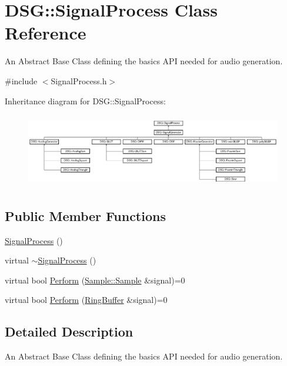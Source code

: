 \hypertarget{classDSG_1_1SignalProcess}{\section{D\+S\+G\+:\+:Signal\+Process Class Reference}
\label{classDSG_1_1SignalProcess}
}


An Abstract Base Class defining the basics A\+P\+I needed for audio generation.  




{\ttfamily \#include $<$Signal\+Process.\+h$>$}

Inheritance diagram for D\+S\+G\+:\+:Signal\+Process\+:\begin{figure}[H]
\begin{center}
\leavevmode
\includegraphics[height=3.245033cm]{classDSG_1_1SignalProcess}
\end{center}
\end{figure}
\subsection*{Public Member Functions}
\begin{DoxyCompactItemize}
\item 
\hyperlink{classDSG_1_1SignalProcess_a3fd4347483bcf3cc0a3d7bf98ff56218}{Signal\+Process} ()
\item 
virtual \hyperlink{classDSG_1_1SignalProcess_ad9b6a758241a092ddc38e13effc9553f}{$\sim$\+Signal\+Process} ()
\item 
virtual bool \hyperlink{classDSG_1_1SignalProcess_afdb8220100418893950c1161dd24db67}{Perform} (\hyperlink{classDSG_1_1Sample_aaf2e30d73911eccea99b53eeee15b612}{Sample\+::\+Sample} \&signal)=0
\item 
virtual bool \hyperlink{classDSG_1_1SignalProcess_a9df44fe60cca01c3c697283408cecf4d}{Perform} (\hyperlink{classDSG_1_1RingBuffer}{Ring\+Buffer} \&signal)=0
\end{DoxyCompactItemize}


\subsection{Detailed Description}
An Abstract Base Class defining the basics A\+P\+I needed for audio generation. 

